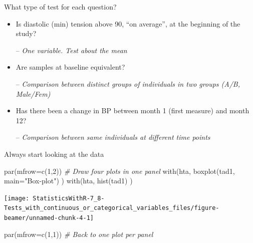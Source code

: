 \documentclass[
  ignorenonframetext,
]{beamer}
\newenvironment{Shaded}{\begin{snugshade}}{\end{snugshade}}
\newcommand{\AttributeTok}[1]{\textcolor[rgb]{0.77,0.63,0.00}{#1}}
\newcommand{\CommentTok}[1]{\textcolor[rgb]{0.56,0.35,0.01}{\textit{#1}}}
\newcommand{\DecValTok}[1]{\textcolor[rgb]{0.00,0.00,0.81}{#1}}
\newcommand{\FunctionTok}[1]{\textcolor[rgb]{0.00,0.00,0.00}{#1}}
\newcommand{\NormalTok}[1]{#1}
\newcommand{\StringTok}[1]{\textcolor[rgb]{0.31,0.60,0.02}{#1}}
\begin{document}
\begin{frame}{What type of test for each question?}
\protect\hypertarget{what-type-of-test-for-each-question}{}
\begin{itemize}
\item
  Is diastolic (min) tension above 90, ``on average'', at the beginning
  of the study?

  -- \emph{One variable. Test about the mean}
\item
  Are samples at baseline equivalent?

  -- \emph{Comparison between distinct groups of individuals in two
  groups (A/B, Male/Fem)}
\item
  Has there been a change in BP between month 1 (first measure) and
  month 12?

  -- \emph{Comparison between same individuals at different time points}
\end{itemize}
\end{frame}

\begin{frame}[fragile]{Always start looking at the data}
\protect\hypertarget{always-start-looking-at-the-data}{}
\begin{Shaded}
\begin{Highlighting}[]
\FunctionTok{par}\NormalTok{(}\AttributeTok{mfrow=}\FunctionTok{c}\NormalTok{(}\DecValTok{1}\NormalTok{,}\DecValTok{2}\NormalTok{)) }\CommentTok{\# Draw four plots in one panel }
\FunctionTok{with}\NormalTok{(hta, }\FunctionTok{boxplot}\NormalTok{(tad1, }\AttributeTok{main=}\StringTok{"Box{-}plot"}\NormalTok{) )}
\FunctionTok{with}\NormalTok{(hta, }\FunctionTok{hist}\NormalTok{(tad1) )}
\end{Highlighting}
\end{Shaded}

\texttt{[image: StatisticsWithR-7\_8-Tests\_with\_continuous\_or\_categorical\_variables\_files/figure-beamer/unnamed-chunk-4-1]}

\begin{Shaded}
\begin{Highlighting}[]
\FunctionTok{par}\NormalTok{(}\AttributeTok{mfrow=}\FunctionTok{c}\NormalTok{(}\DecValTok{1}\NormalTok{,}\DecValTok{1}\NormalTok{)) }\CommentTok{\# Back to one plot per panel}
\end{Highlighting}
\end{Shaded}
\end{frame}
\end{document}

